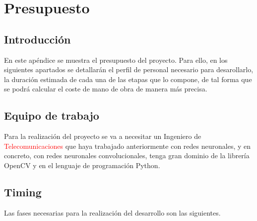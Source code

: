 
\chapter{Presupuesto}
\label{cha:presupuesto}

\section{Introducción}
\label{sec:intro-presupuesto}

En este apéndice se muestra el presupuesto del proyecto. Para ello, en los siguientes apartados se detallarán el perfil de personal necesario para desarollarlo, la duración estimada de cada una de las etapas que lo compone, de tal forma que se podrá calcular el coste de mano de obra de manera más precisa.

\section{Equipo de trabajo}
\label{sec:equipo-presupuesto}

Para la realización del proyecto se va a necesitar un Ingeniero de \textcolor{red}{Telecomunicaciones} que haya trabajado anteriormente con redes neuronales, y en concreto, con redes neuronales convolucionales, tenga gran dominio de la librería OpenCV y en el lenguaje de programación Python.

\section{Timing}
\label{sec:timing-presupuesto}

Las fases necesarias para la realización del desarrollo son las siguientes.

